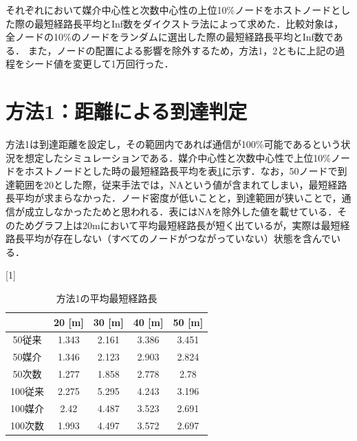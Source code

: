 それぞれにおいて媒介中心性と次数中心性の上位10\%ノードをホストノードとした際の最短経路長平均とInf数をダイクストラ法によって求めた．比較対象は，全ノードの10\%のノードをランダムに選出した際の最短経路長平均とInf数である．
また，ノードの配置による影響を除外するため，方法1，2ともに上記の過程をシード値を変更して1万回行った．


\section{方法1：距離による到達判定}
方法1は到達距離を設定し，その範囲内であれば通信が100\%可能であるという状況を想定したシミュレーションである．媒介中心性と次数中心性で上位10\%ノードをホストノードとした時の最短経路長平均を表\ref{tab:1_spl_bet}に示す．なお，50ノードで到達範囲を20とした際，従来手法では，NAという値が含まれてしまい，最短経路長平均が求まらなかった．ノード密度が低いことと，到達範囲が狭いことで，通信が成立しなかったためと思われる．表にはNAを除外した値を載せている．そのためグラフ上は20\si{\meter}において平均最短経路長が短く出ているが，実際は最短経路長平均が存在しない（すべてのノードがつながっていない）状態を含んでいる．

\begin{table}[H]
\centering
\caption{方法1の平均最短経路長}
\scalebox{1}[1]{
  \begin{tabular}{c|c|c|c|c} \hline\hline
 & 20 [\si{\meter}] & 30 [\si{\meter}] & 40 [\si{\meter}] &50 [\si{\meter}]\\ \hline
50従来 & 1.343 & 2.161 & 3.386 & 3.451 \\
50媒介 & 1.346 & 2.123 & 2.903 & 2.824 \\
50次数 & 1.277 & 1.858 & 2.778 & 2.78 \\ 
100従来 & 2.275 & 5.295 & 4.243 & 3.196 \\ 
100媒介 & 2.42 & 4.487 & 3.523 & 2.691 \\ 
100次数 & 1.993 & 4.497 & 3.572 & 2.697 \\ \hline\hline
  \end{tabular}
  }
\label{tab:1_spl_bet}
\end{table}

